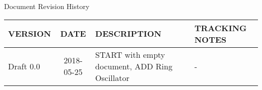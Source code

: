 Document Revision History
\begin{table}[h] %
    \begin{tabular}{|l|c|ll|} \hline
        VERSION & DATE & DESCRIPTION & TRACKING NOTES\\ \hline\hline
        Draft 0.0 & 2018-05-25 & START with empty document, ADD Ring Oscillator & -\\ \hline
    \end{tabular}
\end{table}
